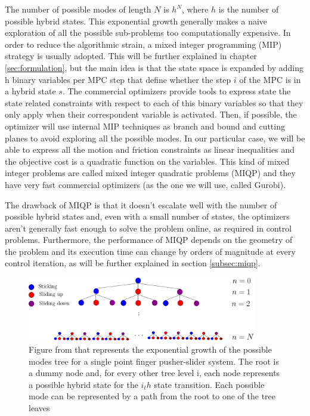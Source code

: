 \documentclass[12,twoside]{TFG-GM}
\theoremstyle{definition}
\theoremstyle{remark}
\begin{document}
The number of possible modes of length $N$ is $h^N$, where $h$ is the number of possible hybrid states. This exponential growth generally makes a naive exploration of all the possible sub-problems too computationally expensive. In order to reduce the algorithmic strain, a mixed integer programming (MIP) strategy is usually adopted. This will be further explained in chapter \ref{sec:formulation}, but the main idea is that the state space is expanded by adding h binary variables per MPC step that define whether the step $i$ of the MPC is in a hybrid state $s$. The commercial optimizers provide tools to express state the state related constraints with respect to each of this binary variables so that they only apply when their correspondent variable is activated. Then, if possible, the optimizer will use internal MIP techniques as branch and bound and cutting planes \cite{gurobi_mip} to avoid exploring all the possible modes. In our particular case, we will be able to express all the motion and friction constraints as linear inequalities and the objective cost is a quadratic function on the variables. This kind of mixed integer problems are called mixed integer quadratic problems (MIQP) and they have very fast commercial optimizers (as the one we will use, called Gurobi). 

The drawback of MIQP is that it doesn't escalate well with the number of possible hybrid states and, even with a small number of states, the optimizers aren't generally fast enough to solve the problem online, as required in control problems. Furthermore, the performance of MIQP depends on the geometry of the problem and its execution time can change by orders of magnitude at every control iteration, as will be further explained in section \ref{subsec:miqp}.

\begin{figure}[htb!]
\begin{center}
\includegraphics[width=10cm]{MPC_Tree-eps-converted-to.pdf}
\end{center}
\caption[test caption]{\label{fig:mode_tree} \small{Figure from \protect\cite{fom} that represents the exponential growth of the possible modes tree for a single point finger pusher-slider system. The root is a dummy node and, for every other tree level i, each node represents a possible hybrid state for the $i_th$ state transition. Each possible mode can be represented by a path from the root to one of the tree leaves}}
\end{figure}
\end{document}
